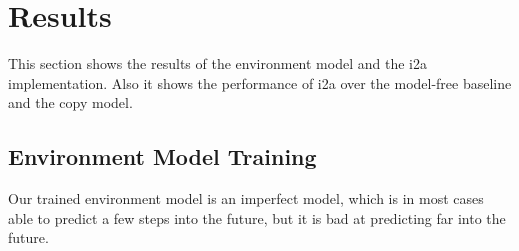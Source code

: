 \section{Results}

This section shows the results of the environment model and the i2a implementation. Also it shows the performance of i2a over the model-free baseline and the copy model.\\


\subsection{Environment Model Training}

Our trained environment model is an imperfect model, which is in most cases able to predict a few steps into the future, but it is bad at predicting far into the future.\\

